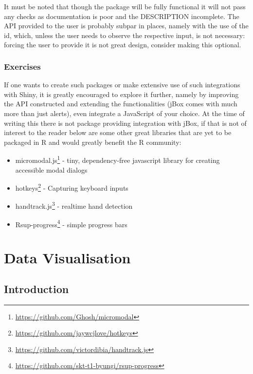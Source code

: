 \documentclass[
]{krantz}
\providecommand{\tightlist}{%
  \setlength{\itemsep}{0pt}\setlength{\parskip}{0pt}}
\renewcommand{\href}[2]{#2\footnote{\url{#1}}}
\begin{document}
It must be noted that though the package will be fully functional it will not pass any checks as documentation is poor and the DESCRIPTION incomplete. The API provided to the user is probably subpar in places, namely with the use of the id, which, unless the user needs to observe the respective input, is not necessary: forcing the user to provide it is not great design, consider making this optional.

\hypertarget{exercises}{%
\section*{Exercises}\label{exercises}}


If one wants to create such packages or make extensive use of such integrations with Shiny, it is greatly encouraged to explore it further, namely by improving the API constructed and extending the functionalities (jBox comes with much more than just alerts), even integrate a JavaScript of your choice. At the time of writing this there is not package providing integration with jBox, if that is not of interest to the reader below are some other great libraries that are yet to be packaged in R and would greatly benefit the R community:

\begin{itemize}
\tightlist
\item
  \href{https://github.com/Ghosh/micromodal}{micromodal.js} - tiny, dependency-free javascript library for creating accessible modal dialogs
\item
  \href{https://github.com/jaywcjlove/hotkeys}{hotkeys} - Capturing keyboard inputs
\item
  \href{https://github.com/victordibia/handtrack.js}{handtrack.js} - realtime hand detection
\item
  \href{https://github.com/skt-t1-byungi/rsup-progress}{Rsup-progress} - simple progress bars
\end{itemize}

\hypertarget{part-data-visualisation}{%
\part{Data Visualisation}\label{part-data-visualisation}}

\hypertarget{introduction-2}{%
\chapter{Introduction}\label{introduction-2}}
\end{document}
